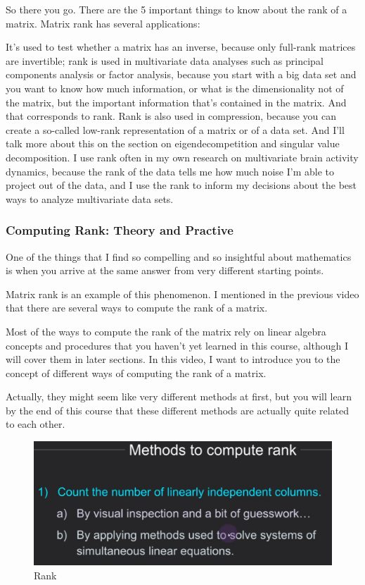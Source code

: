\documentclass[fleqn,10pt]{olplainarticle}
\theoremstyle{definition}
\theoremstyle{remark}
\begin{document}
So there you go. There are the 5 important things to know about the rank of a matrix. Matrix rank has several applications:

It's used to test whether a matrix has an inverse, because only full-rank matrices are invertible; rank is used in multivariate data analyses such as principal components analysis or factor analysis, because you start with a big data set and you want to know how much information, or what is the dimensionality
not of the matrix, but the important information that's contained in the matrix. And that corresponds to rank. Rank is also used in compression, because you can create a so-called low-rank representation of a matrix or of a data set. And I'll talk more about this on the section on eigendecompetition and singular value decomposition. I use rank often in my own research on multivariate brain activity dynamics, because the rank of the data tells me how much noise I'm able to project out of the data, and I use the rank to inform my decisions about the best ways to analyze multivariate data sets.

\pagebreak

\subsubsection*{Computing Rank: Theory and Practive}

One of the things that I find so compelling and so insightful about mathematics is when you arrive at the same answer from very different starting points.

Matrix rank is an example of this phenomenon. I mentioned in the previous video that there are several ways to compute the rank of a matrix.

Most of the ways to compute the rank of the matrix rely on linear algebra concepts and procedures that you haven't yet learned in this course, although I will cover them in later sections. In this video, I want to introduce you to the concept of different ways of computing the rank of a matrix.

Actually, they might seem like very different methods at first, but you will learn by the end of this course that these different methods are actually quite related to each other.

\begin{figure}[ht]
	\centering
	\includegraphics[width=0.5\linewidth]{images/rank-13.png}
	\caption{Rank}
	\label{fig:rank_13}
\end{figure}
\end{document}

